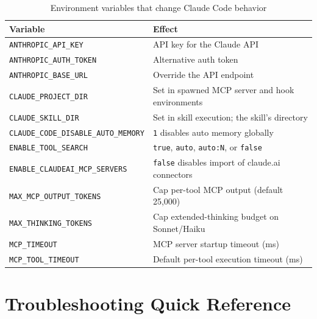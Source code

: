 \begin{table}[ht]
\centering
\caption{Environment variables that change Claude Code behavior}
\label{tab:app-env}
\begin{tabularx}{\textwidth}{lX}
\toprule
\textbf{Variable} & \textbf{Effect} \\
\midrule
\texttt{ANTHROPIC\_API\_KEY}                     & API key for the Claude API \\
\texttt{ANTHROPIC\_AUTH\_TOKEN}                  & Alternative auth token \\
\texttt{ANTHROPIC\_BASE\_URL}                    & Override the API endpoint \\
\texttt{CLAUDE\_PROJECT\_DIR}                    & Set in spawned MCP server and hook environments \\
\texttt{CLAUDE\_SKILL\_DIR}                      & Set in skill execution; the skill's directory \\
\texttt{CLAUDE\_CODE\_DISABLE\_AUTO\_MEMORY}     & \texttt{1} disables auto memory globally \\
\texttt{ENABLE\_TOOL\_SEARCH}                    & \texttt{true}, \texttt{auto}, \texttt{auto:N}, or \texttt{false} \\
\texttt{ENABLE\_CLAUDEAI\_MCP\_SERVERS}          & \texttt{false} disables import of claude.ai connectors \\
\texttt{MAX\_MCP\_OUTPUT\_TOKENS}                & Cap per-tool MCP output (default 25,000) \\
\texttt{MAX\_THINKING\_TOKENS}                   & Cap extended-thinking budget on Sonnet/Haiku \\
\texttt{MCP\_TIMEOUT}                            & MCP server startup timeout (ms) \\
\texttt{MCP\_TOOL\_TIMEOUT}                      & Default per-tool execution timeout (ms) \\
\bottomrule
\end{tabularx}
\end{table}

\section{Troubleshooting Quick Reference}
\label{app:trouble}

